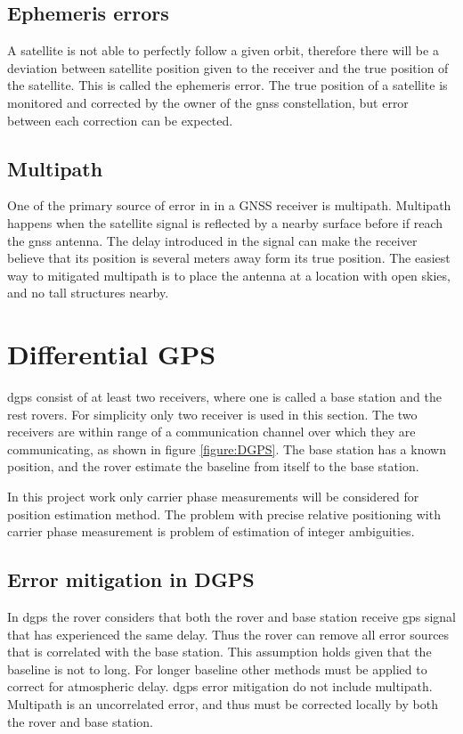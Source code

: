 \subsection{Ephemeris errors}
A satellite is not able to perfectly follow a given orbit, therefore there will be a deviation between satellite position given to the receiver and the true position of the satellite. This is called the ephemeris error. The true position of a satellite is monitored and corrected by the owner of the \gls{gnss} constellation, but error between each correction can be expected.
\subsection{Multipath}
One of the primary source of error in in a GNSS receiver is multipath. Multipath happens when the satellite signal is reflected by a nearby surface before if reach the \gls{gnss} antenna. The delay introduced in the signal can make the receiver believe that its position is several meters away form its true position. The easiest way to mitigated multipath is to place the antenna at a location with open skies, and no tall structures nearby.
\section{Differential GPS}
\acrfull{dgps} consist of at least two receivers, where one is called a base station and the rest rovers. For simplicity only two receiver is used in this section. The two receivers are within range of a communication channel over which they are communicating, as shown in figure \ref{figure:DGPS}. The base station has a known position, and the rover estimate the baseline from itself to the base station.

In this project work only carrier phase measurements will be considered for position estimation method.
The problem with precise relative positioning with carrier phase measurement is problem of estimation of integer ambiguities.


\subsection{Error mitigation in DGPS} \label{ss: Error mitigation DGPS}
In \gls{dgps} the rover considers that both the rover and base station receive \gls{gps} signal that has experienced the same delay. Thus the rover can remove all error sources that is correlated with the base station. This assumption holds given that the baseline is not to long. For longer baseline other methods must be applied to correct for atmospheric delay. \gls{dgps} error mitigation do not include multipath. Multipath is an uncorrelated error, and thus must be corrected locally by both the rover and base station.



\cleardoublepage